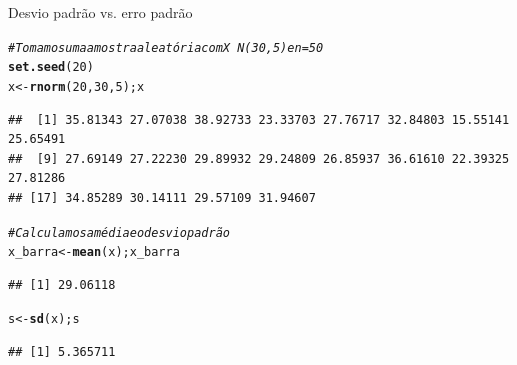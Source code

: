 \documentclass{beamer}\usepackage[]{graphicx}\usepackage[]{color}
\makeatletter
\newcommand{\hlnum}[1]{\textcolor[rgb]{0.686,0.059,0.569}{#1}}%
\newcommand{\hlcom}[1]{\textcolor[rgb]{0.678,0.584,0.686}{\textit{#1}}}%
\newcommand{\hlstd}[1]{\textcolor[rgb]{0.345,0.345,0.345}{#1}}%
\newcommand{\hlkwb}[1]{\textcolor[rgb]{0.69,0.353,0.396}{#1}}%
\newcommand{\hlkwd}[1]{\textcolor[rgb]{0.737,0.353,0.396}{\textbf{#1}}}%
\newenvironment{kframe}{%
 \def\at@end@of@kframe{}%
 \ifinner\ifhmode%
  \def\at@end@of@kframe{\end{minipage}}%
  \begin{minipage}{\columnwidth}%
 \fi\fi%
 \def\FrameCommand##1{\hskip\@totalleftmargin \hskip-\fboxsep
 \colorbox{shadecolor}{##1}\hskip-\fboxsep
     \hskip-\linewidth \hskip-\@totalleftmargin \hskip\columnwidth}%
 \MakeFramed {\advance\hsize-\width
   \@totalleftmargin\z@ \linewidth\hsize
   \@setminipage}}%
 {\par\unskip\endMakeFramed%
 \at@end@of@kframe}
\newenvironment{knitrout}{}{} %
\renewenvironment{knitrout}{\setlength{\topsep}{0mm}}{}
\makeatother
\begin{document}
\begin{frame}[fragile]{Desvio padrão vs. erro padrão}


\begin{knitrout}\tiny
{}\color{fgcolor}\begin{kframe}
\begin{alltt}
\hlcom{# Tomamos uma amostra aleatória com X ~ N(30,5) e n=50}
\hlkwd{set.seed}\hlstd{(}\hlnum{20}\hlstd{)}
\hlstd{x} \hlkwb{<-} \hlkwd{rnorm}\hlstd{(}\hlnum{20}\hlstd{,}\hlnum{30}\hlstd{,}\hlnum{5}\hlstd{); x}
\end{alltt}
\begin{verbatim}
##  [1] 35.81343 27.07038 38.92733 23.33703 27.76717 32.84803 15.55141 25.65491
##  [9] 27.69149 27.22230 29.89932 29.24809 26.85937 36.61610 22.39325 27.81286
## [17] 34.85289 30.14111 29.57109 31.94607
\end{verbatim}
\begin{alltt}
\hlcom{# Calculamos a média e o desvio padrão}
\hlstd{x_barra} \hlkwb{<-} \hlkwd{mean}\hlstd{(x); x_barra}
\end{alltt}
\begin{verbatim}
## [1] 29.06118
\end{verbatim}
\begin{alltt}
\hlstd{s} \hlkwb{<-} \hlkwd{sd}\hlstd{(x); s}
\end{alltt}
\begin{verbatim}
## [1] 5.365711
\end{verbatim}
\end{kframe}
\end{knitrout}

\end{frame} 
\end{document}
